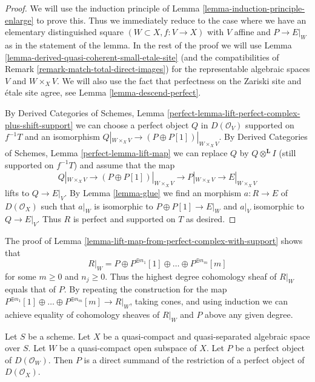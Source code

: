 \begin{proof}
We will use the induction principle of
Lemma \ref{lemma-induction-principle-enlarge} to prove this.
Thus we immediately reduce to the case where we have an
elementary distinguished square $(W \subset X, f : V \to X)$
with $V$ affine and $P \to E|_W$ as in the statement of the lemma.
In the rest of the proof we will use
Lemma \ref{lemma-derived-quasi-coherent-small-etale-site}
(and the compatibilities of Remark \ref{remark-match-total-direct-images})
for the representable algebraic spaces $V$ and $W \times_X V$.
We will also use the fact that perfectness on the Zariski site
and \'etale site agree, see Lemma \ref{lemma-descend-perfect}.

\medskip\noindent
By Derived Categories of Schemes,
Lemma \ref{perfect-lemma-lift-perfect-complex-plus-shift-support}
we can choose a perfect object $Q$ in $D(\mathcal{O}_V)$
supported on $f^{-1}T$ and an isomorphism
$Q|_{W \times_X V} \to (P \oplus P[1])|_{W \times_X V}$. By
Derived Categories of Schemes, Lemma \ref{perfect-lemma-lift-map}
we can replace $Q$ by $Q \otimes^\mathbf{L} I$ (still supported on $f^{-1}T$)
and assume that the map
$$
Q|_{W \times_X V} \to (P \oplus P[1])|_{W \times_X V}
\longrightarrow P|_{W \times_X V}
\longrightarrow
E|_{W \times_X V}
$$
lifts to $Q \to E|_V$. By Lemma \ref{lemma-glue}
we find an morphism $a : R \to E$ of $D(\mathcal{O}_X)$
such that $a|_W$ is isomorphic to $P \oplus P[1] \to E|_W$
and $a|_V$ isomorphic to $Q \to E|_V$.
Thus $R$ is perfect and supported on $T$ as desired.
\end{proof}

\begin{remark}
\label{remark-addendum}
The proof of Lemma \ref{lemma-lift-map-from-perfect-complex-with-support}
shows that
$$
R|_W = P \oplus P^{\oplus n_1}[1] \oplus \ldots \oplus P^{\oplus n_m}[m]
$$
for some $m \geq 0$ and $n_j \geq 0$. Thus the highest degree cohomology sheaf
of $R|_W$ equals that of $P$. By repeating the construction for the map
$P^{\oplus n_1}[1] \oplus \ldots \oplus P^{\oplus n_m}[m] \to R|_W$, taking
cones, and using induction we can achieve equality of cohomology sheaves
of $R|_W$ and $P$ above any given degree.
\end{remark}

\begin{lemma}
\label{lemma-direct-summand-of-a-restriction}
Let $S$ be a scheme.
Let $X$ be a quasi-compact and quasi-separated algebraic space over $S$.
Let $W$ be a quasi-compact open subspace of $X$.
Let $P$ be a perfect object of $D(\mathcal{O}_W)$.
Then $P$ is a direct summand of the restriction of a perfect
object of $D(\mathcal{O}_X)$.
\end{lemma}

